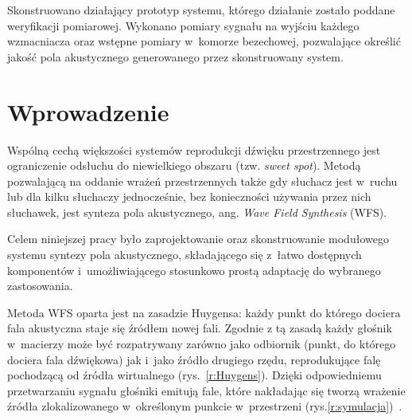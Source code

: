 \documentclass[10pt, a4paper]{article}
\let\Oldsection\section
\renewcommand{\section}{\FloatBarrier\Oldsection}
\begin{document}
Skonstruowano działający prototyp systemu, którego działanie zostało poddane weryfikacji pomiarowej. Wykonano pomiary sygnału na wyjściu każdego wzmacniacza oraz wstępne pomiary w~komorze bezechowej, pozwalające określić jakość pola akustycznego generowanego przez skonstruowany system.

\section{Wprowadzenie}

Wspólną cechą większości systemów reprodukcji dźwięku przestrzennego jest
ograniczenie odsłuchu do niewielkiego obszaru (tzw. \textit{sweet spot}).
Metodą pozwalającą na oddanie wrażeń przestrzennych także gdy słuchacz jest
w~ruchu lub dla kilku słuchaczy jednocześnie, bez konieczności używania przez
nich słuchawek, jest synteza pola akustycznego, ang. \textit{Wave Field Synthesis}
(WFS).

Celem niniejszej pracy było zaprojektowanie oraz skonstruowanie modułowego systemu
syntezy pola akustycznego, składającego się z~łatwo dostępnych komponentów
\linebreak i~umożliwiającego stosunkowo prostą adaptację do wybranego zastosowania.

Metoda WFS oparta jest na zasadzie Huygensa: każdy punkt do którego dociera
fala akustyczna staje się źródłem nowej fali. Zgodnie z tą zasadą każdy głośnik
w~macierzy może być rozpatrywany zarówno jako odbiornik (punkt, do którego
dociera fala dźwiękowa) jak i~jako źródło drugiego rzędu, reprodukujące falę
pochodzącą od źródła wirtualnego (rys.~\ref{r:Huygens}). Dzięki
odpowiedniemu przetwarzaniu sygnału głośniki emitują fale, które nakładając
się tworzą wrażenie źródła zlokalizowanego w~określonym punkcie w~przestrzeni (rys.\ref{r:symulacja})~\cite{hq_rendering}.
\end{document}
